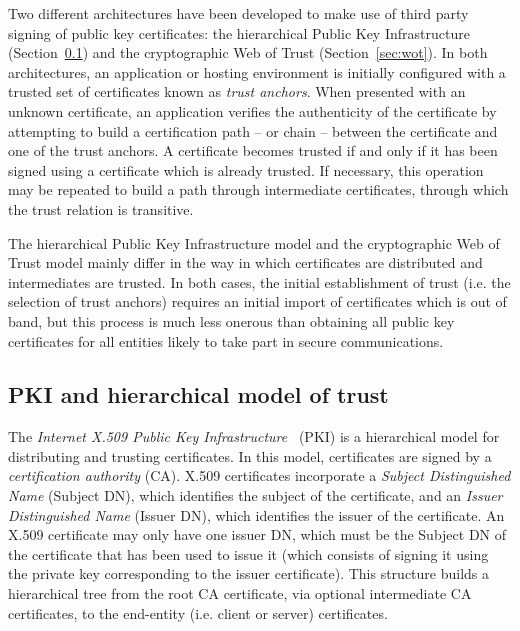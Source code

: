 \documentclass{llncs}
\begin{document}
Two different architectures have been developed to make use of third
party signing of public key certificates: the hierarchical Public Key
Infrastructure (Section~\ref{sec:pkix}) and the cryptographic Web of
Trust (Section~\ref{sec:wot}).  In both architectures, an application
or hosting environment is initially configured with a trusted set of
certificates known as {\em trust anchors}.  When presented with an
unknown certificate, an application verifies the authenticity of the
certificate by attempting to build a certification path -- or chain --
between the certificate and one of the trust anchors. A certificate
becomes trusted if and only if it has been signed using a certificate
which is already trusted. If necessary, this operation may be repeated
to build a path through intermediate certificates, through which the
trust relation is transitive.


The hierarchical Public Key Infrastructure model and the cryptographic
Web of Trust model mainly differ in the way in which certificates are
distributed and intermediates are trusted. In both cases, the initial
establishment of trust (i.e. the selection of trust anchors) requires
an initial import of certificates which is out of band, but this
process is much less onerous than obtaining all public key
certificates for all entities likely to take part in secure
communications.


\subsection{PKI and hierarchical model of trust}
\label{sec:pkix}

The {\em Internet X.509 Public Key Infrastructure}~\cite{rfc5280}
(PKI) is a hierarchical model for distributing and trusting
certificates. In this model, certificates are signed by a {\em
  certification authority} (CA). X.509 certificates incorporate a {\em
  Subject Distinguished Name} (Subject DN), which identifies the
subject of the certificate, and an {\em Issuer Distinguished Name}
(Issuer DN), which identifies the issuer of the certificate. An X.509
certificate may only have one issuer DN, which must be the Subject DN
of the certificate that has been used to issue it (which consists of
signing it using the private key corresponding to the issuer
certificate). This structure builds a hierarchical tree from the root
CA certificate, via optional intermediate CA certificates, to the
end-entity (i.e. client or server) certificates.
\end{document}
